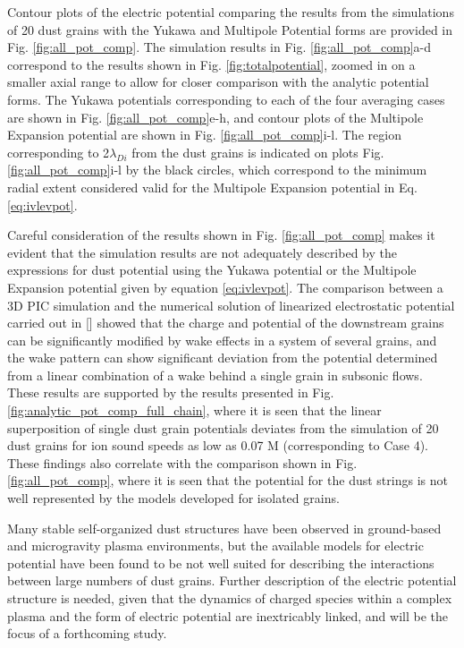 \documentclass[aip,amsmath,amssymb,graphicx,floatfix,reprint]{revtex4-1}
\begin{document}
Contour plots of the electric potential comparing the results from the simulations of 20 dust grains with the Yukawa and Multipole Potential forms are provided in Fig. \ref{fig:all_pot_comp}. The simulation results in Fig. \ref{fig:all_pot_comp}a-d correspond to the results shown in Fig. \ref{fig:totalpotential}, zoomed in on a smaller axial range to allow for closer comparison with the analytic potential forms.  The Yukawa potentials corresponding to each of the four averaging cases are shown in Fig. \ref{fig:all_pot_comp}e-h, and contour plots of the Multipole Expansion potential are shown in Fig. \ref{fig:all_pot_comp}i-l.  The region corresponding to 2$\lambda_{Di}$ from the dust grains is indicated on plots Fig. \ref{fig:all_pot_comp}i-l by the black circles, which correspond to the minimum radial extent considered valid for the Multipole Expansion potential in Eq. \ref{eq:ivlevpot}.


Careful consideration of the results shown in Fig. \ref{fig:all_pot_comp} makes it evident that the simulation results are not adequately described by the expressions for dust potential using the Yukawa potential or the Multipole Expansion potential given by equation \ref{eq:ivlevpot}.  The comparison between a 3D PIC simulation and the numerical solution of linearized electrostatic potential carried out in [] showed that the charge and potential of the downstream grains can be significantly modified by wake effects in a system of several grains, and the wake pattern can show significant deviation from the potential determined from a linear combination of a wake behind a single grain in subsonic flows.  These results are supported by the results presented in Fig. \ref{fig:analytic_pot_comp_full_chain}, where it is seen that the linear superposition of single dust grain potentials deviates from the simulation of 20 dust grains for ion sound speeds as low as 0.07 M (corresponding to Case 4).  These findings also correlate with the comparison shown in Fig. \ref{fig:all_pot_comp}, where it is seen that the potential for the dust strings is not well represented by the models developed for isolated grains.


Many stable self-organized dust structures have been observed in ground-based and microgravity plasma environments, but the available models for electric potential have been found to be not well suited for describing the interactions between large numbers of dust grains.  Further description of the electric potential structure is needed, given that the dynamics of charged species within a complex plasma and the form of electric potential are inextricably linked, and will be the focus of a forthcoming study.  
\end{document}
